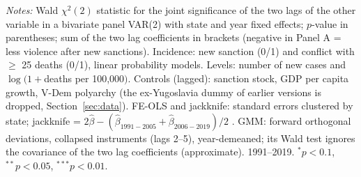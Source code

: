 \begin{table}[htbp]
\begin{threeparttable}
\begin{tablenotes}[flushleft]
\item \textit{Notes:} Wald $\chi^2(2)$ statistic for the joint significance of the two lags of the other variable in a bivariate panel VAR(2) with state and year fixed effects; $p$-value in parentheses; sum of the two lag coefficients in brackets (negative in Panel A = less violence after new sanctions). Incidence: new sanction (0/1) and conflict with $\geq$ 25 deaths (0/1), linear probability models. Levels: number of new cases and $\log(1+$deaths per 100,000$)$. Controls (lagged): sanction stock, GDP per capita growth, V-Dem polyarchy (the ex-Yugoslavia dummy of earlier versions is dropped, Section~\ref{sec:data}). FE-OLS and jackknife: standard errors clustered by state; jackknife = $2\hat\beta - (\hat\beta_{1991-2005} + \hat\beta_{2006-2019})/2$ \citep{dhaene2015}. GMM: forward orthogonal deviations, collapsed instruments (lags 2--5), year-demeaned; its Wald test ignores the covariance of the two lag coefficients (approximate). 1991--2019. $^{*}p<0.1$, $^{**}p<0.05$, $^{***}p<0.01$.
\end{tablenotes}
\end{threeparttable}
\end{table}
